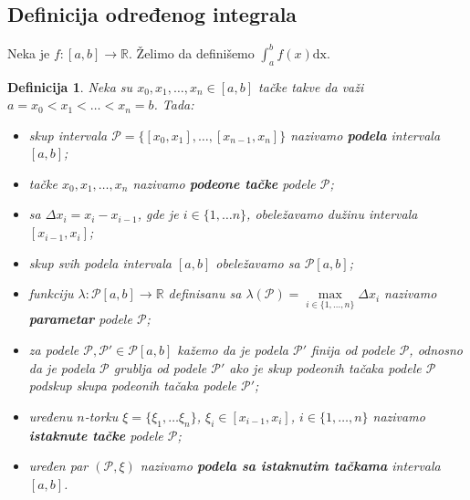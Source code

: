 \documentclass{article}
\newtheorem{definicija}{Definicija}[section]
\begin{document}
\subsection{Definicija određenog integrala}
Neka je $f:[a,b]\longrightarrow\mathbb{R}$. Želimo da definišemo $\displaystyle\int_{a}^{b}f(x)\text{dx}$.\par
\begin{defbox}
    \begin{definicija}
        Neka su $x_0,x_1,\dotsc,x_n\in[a,b]$ tačke takve da važi $a=x_0<x_1<\dotsc<x_n=b$. Tada:
        \begin{itemize}
            \item skup intervala $\mathcal{P}=\{[x_0,x_1],\dotsc,[x_{n-1},x_n]\}$ nazivamo \textbf{podela} intervala $[a,b]$;
            \item tačke $x_0,x_1,\dotsc,x_n$ nazivamo \textbf{podeone tačke} podele $\mathcal{P}$;
            \item sa $\varDelta x_i=x_i-x_{i-1}$, gde je $i\in\{1,\dotsc n\}$, obeležavamo dužinu intervala $[x_{i-1},x_i]$;
            \item skup svih podela intervala $[a,b]$ obeležavamo sa $\mathcal{P}[a,b]$;
            \item funkciju $\lambda: \mathcal{P}[a,b]\longrightarrow \mathbb{R}$ definisanu sa $\lambda(\mathcal{P})=\underset{i \in \{1, \dots, n\}}{\max}\varDelta x_i$ nazivamo \textbf{parametar} podele $\mathcal{P}$;
            \item za podele $\mathcal{P},\mathcal{P}'\in\mathcal{P}[a,b]$ kažemo da je podela $\mathcal{P}'$ finija od podele $\mathcal{P}$, odnosno da
                  je podela $\mathcal{P}$ grublja od podele $\mathcal{P}'$ ako je skup podeonih tačaka podele $\mathcal{P}$ podskup skupa
                  podeonih tačaka podele $\mathcal{P}'$;
            \item uređenu $n$-torku $\xi=\{\xi_1,\dotsc\xi_n\}$, $\xi_i\in[x_{i-1},x_i]$, $i\in\{1,\dotsc,n\}$ nazivamo \textbf{istaknute tačke} podele $\mathcal{P}$;
            \item uređen par $(\mathcal{P},\xi)$ nazivamo \textbf{podela sa istaknutim tačkama} intervala $[a,b]$.
        \end{itemize}
    \end{definicija}
\end{defbox}
\end{document}
